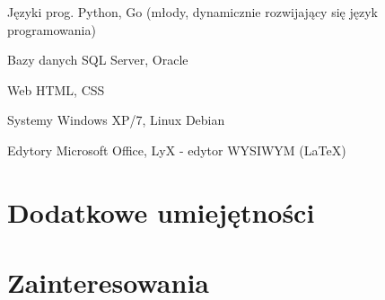 \documentclass[11pt,a4paper,sans,polish]{moderncv}   %
\begin{document}
\cvitemwithcomment
	{Języki prog.}
	{Python, Go (młody, dynamicznie rozwijający się język programowania)}{}

\cvitemwithcomment
	{Bazy danych}
	{SQL Server, Oracle}{}

\cvitemwithcomment
	{Web}
	{HTML, CSS}{}

\cvitemwithcomment
	{Systemy}
	{Windows XP/7, Linux Debian}{}

\cvitemwithcomment
	{Edytory}
	{Microsoft Office, LyX - edytor WYSIWYM (\LaTeX{})}{}


\section{Dodatkowe umiejętności}



\section{Zainteresowania}



\thispagestyle{zgoda}
\end{document}
